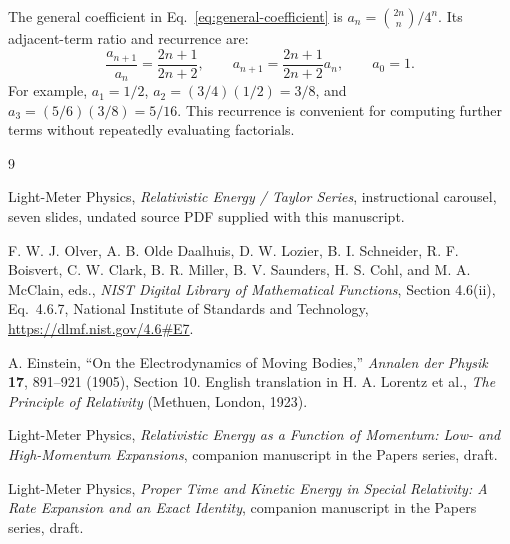 \documentclass[12pt]{article}
\begin{document}
The general coefficient in Eq.~\eqref{eq:general-coefficient} is $a_n=\binom{2n}{n}/4^n$. Its adjacent-term ratio and recurrence are:
\begin{equation}
  \frac{a_{n+1}}{a_n}=\frac{2n+1}{2n+2},
  \qquad
  a_{n+1}=\frac{2n+1}{2n+2}a_n,
  \qquad a_0=1.
  \label{eq:coefficient-recurrence}
\end{equation}
For example, $a_1=1/2$, $a_2=(3/4)(1/2)=3/8$, and $a_3=(5/6)(3/8)=5/16$. This recurrence is convenient for computing further terms without repeatedly evaluating factorials.

\begin{thebibliography}{9}
\small
{}
\raggedright
{}

Light-Meter Physics,
\emph{Relativistic Energy / Taylor Series}, instructional carousel, seven slides,
undated source PDF supplied with this manuscript.

F. W. J. Olver, A. B. Olde Daalhuis, D. W. Lozier, B. I. Schneider,
R. F. Boisvert, C. W. Clark, B. R. Miller, B. V. Saunders, H. S. Cohl,
and M. A. McClain, eds.,
\emph{NIST Digital Library of Mathematical Functions}, Section 4.6(ii),
Eq.~4.6.7, National Institute of Standards and Technology,
\url{https://dlmf.nist.gov/4.6#E7}.

A. Einstein, ``On the Electrodynamics of Moving Bodies,''
\emph{Annalen der Physik} \textbf{17}, 891--921 (1905), Section 10.
English translation in H. A. Lorentz et al.,
\emph{The Principle of Relativity} (Methuen, London, 1923).

Light-Meter Physics,
\emph{Relativistic Energy as a Function of Momentum: Low- and High-Momentum Expansions},
companion manuscript in the Papers series, draft.

Light-Meter Physics,
\emph{Proper Time and Kinetic Energy in Special Relativity: A Rate Expansion and an Exact Identity},
companion manuscript in the Papers series, draft.

\end{thebibliography}
\end{document}
